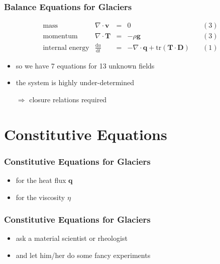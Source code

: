 \documentclass[hide notes,intlimits]{beamer}
\begin{document}
\begin{frame}
  \frametitle{Balance Equations for Glaciers}
  \large{
  \begin{equation*}
  \begin{array}{lcclc}
    \text{mass} &  \nabla \cdot \mathbf{v} & = & 0 \quad & (3)\\
    \text{momentum} & \nabla \cdot \mathbf{T} & = & - \rho \mathbf{g} \quad & (3)\\
    \text{internal energy} & \frac{\text{d} u}{\text{d} t} & = & - \nabla \cdot \mathbf{q} + \text{tr}\left(\mathbf{T}\cdot\mathbf{D}\right) \quad & (1)
  \end{array}
  \end{equation*}
  }
  \begin{itemize}
   \item so we have 7 equations for 13 unknown fields
   \item the system is highly under-determined
   \item[$\Rightarrow$] \alert{closure relations} required
 \end{itemize}
\end{frame}

\section{Constitutive Equations}

\begin{frame}
  \frametitle{Constitutive Equations for Glaciers}
  \begin{itemize}
    \item for the heat flux $\mathbf{q}$
    \item for the viscosity $\eta$
  \end{itemize}
\end{frame}


\begin{frame}
  \frametitle{Constitutive Equations for Glaciers}
  \begin{itemize}
    \item ask a material scientist or rheologist
    \item and let him/her do some fancy experiments
 \end{itemize}
\end{frame}
\end{document}
